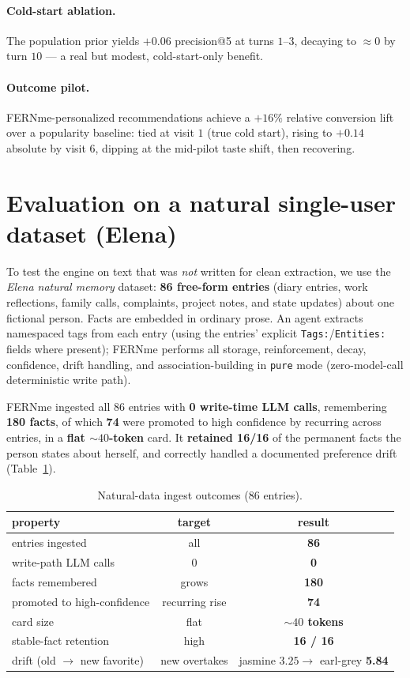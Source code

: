\documentclass[11pt]{article}
\begin{document}
\paragraph{Cold-start ablation.} The population prior yields $+0.06$ precision@5 at turns
$1$--$3$, decaying to ${\approx}0$ by turn $10$ --- a real but modest, cold-start-only
benefit.

\paragraph{Outcome pilot.} FERNme-personalized recommendations achieve a $+16\%$ relative
conversion lift over a popularity baseline: tied at visit $1$ (true cold start), rising to
$+0.14$ absolute by visit $6$, dipping at the mid-pilot taste shift, then recovering.

\section{Evaluation on a natural single-user dataset (Elena)}\label{sec:elena}
To test the engine on text that was \emph{not} written for clean extraction, we use the
\emph{Elena natural memory} dataset: \textbf{86 free-form entries} (diary entries, work
reflections, family calls, complaints, project notes, and state updates) about one
fictional person. Facts are embedded in ordinary prose. An agent extracts namespaced tags
from each entry (using the entries' explicit \texttt{Tags:}/\texttt{Entities:} fields where
present); FERNme performs all storage, reinforcement, decay, confidence, drift handling,
and association-building in \texttt{pure} mode (zero-model-call deterministic write path).

FERNme ingested all 86 entries with \textbf{0 write-time LLM calls}, remembering
\textbf{180 facts}, of which \textbf{74} were promoted to high confidence by recurring
across entries, in a \textbf{flat ${\sim}40$-token} card. It \textbf{retained 16/16} of the
permanent facts the person states about herself, and correctly handled a documented
preference drift (Table~\ref{tab:elena}).

\begin{table}[t]\centering
\caption{Natural-data ingest outcomes (86 entries).}\label{tab:elena}
\begin{tabular}{lcc}
\toprule
property & target & result\\
\midrule
entries ingested & all & \textbf{86}\\
write-path LLM calls & 0 & \textbf{0}\\
facts remembered & grows & \textbf{180}\\
promoted to high-confidence & recurring rise & \textbf{74}\\
card size & flat & \textbf{${\sim}40$ tokens}\\
stable-fact retention & high & \textbf{16 / 16}\\
drift (old $\to$ new favorite) & new overtakes & jasmine $3.25 \to$ earl-grey \textbf{5.84}\\
\bottomrule
\end{tabular}
\end{table}
\end{document}
